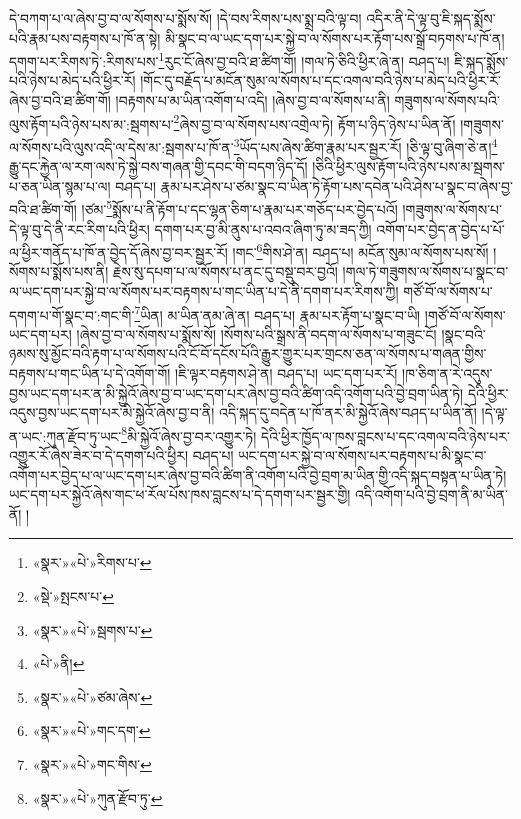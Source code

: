 དེ་བཀག་པ་ལ་ཞེས་བྱ་བ་ལ་སོགས་པ་སྨོས་སོ། །དེ་བས་རིགས་པས་སྨྲ་བའི་ལྟ་བ། འདིར་ནི་དེ་ལྟ་བུ་ཇི་སྐད་སྨོས་པའི་རྣམ་པས་བརྟགས་པ་ཁོ་ན་སྟེ། མི་སྣང་བ་ལ་ཡང་དག་པར་སྐྱེ་བ་ལ་སོགས་པར་རྟོག་པས་སྒྲོ་བཏགས་པ་ཁོ་ན། དགག་པར་རིགས་ཏེ་:རིགས་པས་\footnote{«སྣར་»«པེ་»རིགས་པ་}རུང་ངོ་ཞེས་བྱ་བའི་ཐ་ཚིག་གོ། །གལ་ཏེ་ཅིའི་ཕྱིར་ཞེ་ན། བཤད་པ། ཇི་སྐད་སྨོས་པའི་ཉེས་པ་མེད་པའི་ཕྱིར་རོ། །གོང་དུ་བརྗོད་པ་མངོན་སུམ་ལ་སོགས་པ་དང་འགལ་བའི་ཉེས་པ་མེད་པའི་ཕྱིར་རོ་ཞེས་བྱ་བའི་ཐ་ཚིག་གོ། །བརྟགས་པ་མ་ཡིན་འགོག་པ་འདི། །ཞེས་བྱ་བ་ལ་སོགས་པ་ནི། གཟུགས་ལ་སོགས་པའི་ལུས་རྟོག་པའི་ཉེས་པས་མ་:སྦགས་པ་\footnote{«སྡེ་»སྤངས་པ་}ཞེས་བྱ་བ་ལ་སོགས་པས་འགྲེལ་ཏེ། རྟོག་པ་ཉིད་ཉེས་པ་ཡིན་ནོ། །གཟུགས་ལ་སོགས་པའི་ལུས་འདི་ལ་དེས་མ་:སྦགས་པ་ཁོ་ན་\footnote{«སྣར་»«པེ་»སྦགས་པ་}ཡོད་པས་ཞེས་ཚིག་རྣམ་པར་སྦྱར་རོ། །ཅི་ལྟ་བུ་ཞིག་ཅེ་ན།\footnote{«པེ་»ནི།} རྒྱུ་དང་རྐྱེན་ལ་རག་ལས་ཏེ་སྐྱེ་བས་གཞན་གྱི་དབང་གི་བདག་ཉིད་དོ། །ཅིའི་ཕྱིར་ལུས་རྟོག་པའི་ཉེས་པས་མ་སྦགས་པ་ཅན་ཡིན་སྙམ་པ་ལ། བཤད་པ། རྣམ་པར་ཤེས་པ་ཙམ་སྣང་བ་ཡིན་ཏེ་རྟོག་པས་དབེན་པའི་ཤེས་པ་སྣང་བ་ཞེས་བྱ་བའི་ཐ་ཚིག་གོ། །ཙམ་\footnote{«སྣར་»«པེ་»ཙམ་ཞེས་}སྨོས་པ་ནི་རྟོག་པ་དང་ལྷན་ཅིག་པ་རྣམ་པར་གཅོད་པར་བྱེད་པའོ། །གཟུགས་ལ་སོགས་པ་དེ་ལྟ་བུ་དེ་ནི་རང་རིག་པའི་ཕྱིར། དགག་པར་བྱ་མི་ནུས་པ་འབའ་ཞིག་ཏུ་མ་ཟད་ཀྱི། འགོག་པར་བྱེད་ན་བྱེད་པ་པོ་ལ་ཕྱིར་གནོད་པ་ཁོ་ན་བྱེད་དོ་ཞེས་བྱ་བར་སྦྱར་རོ། །གང་\footnote{«སྣར་»«པེ་»གང་དག་}གིས་ཤེ་ན། བཤད་པ། མངོན་སུམ་ལ་སོགས་པས་སོ། །སོགས་པ་སྨོས་པས་ནི། རྗེས་སུ་དཔག་པ་ལ་སོགས་པ་ནང་དུ་བསྡུ་བར་བྱའོ། །གལ་ཏེ་གཟུགས་ལ་སོགས་པ་སྣང་བ་ལ་ཡང་དག་པར་སྐྱེ་བ་ལ་སོགས་པར་བརྟགས་པ་གང་ཡིན་པ་དེ་ནི་དགག་པར་རིགས་ཀྱི། གཙོ་བོ་ལ་སོགས་པ་དགག་པ་གོ་སྣང་བ་:གང་གི་\footnote{«སྣར་»«པེ་»གང་གིས་}ཡིན། མ་ཡིན་ནམ་ཞེ་ན། བཤད་པ། རྣམ་པར་རྟོག་པ་སྣང་བ་ཡི། །གཙོ་བོ་ལ་སོགས་ཡང་དག་པར། །ཞེས་བྱ་བ་ལ་སོགས་པ་སྨོས་སོ། །སོགས་པའི་སྒྲས་ནི་བདག་ལ་སོགས་པ་གཟུང་ངོ། །སྣང་བའི་ཉམས་སུ་མྱོང་བའི་རྟག་པ་ལ་སོགས་པའི་ངོ་བོ་དངོས་པོའི་རྒྱུར་གྱུར་པར་གྲངས་ཅན་ལ་སོགས་པ་གཞན་གྱིས་བརྟགས་པ་གང་ཡིན་པ་དེ་འགོག་གོ། །ཇི་ལྟར་བརྟགས་ཤེ་ན། བཤད་པ། ཡང་དག་པར་རོ། །ཁ་ཅིག་ན་རེ་འདུས་བྱས་ཡང་དག་པར་ན་མི་སྐྱེའོ་ཞེས་བྱ་བ་ཡང་དག་པར་ཞེས་བྱ་བའི་ཚིག་འདི་འགོག་པའི་བྱེ་བྲག་ཡིན་ཏེ། དེའི་ཕྱིར་འདུས་བྱས་ཡང་དག་པར་མི་སྐྱེའོ་ཞེས་བྱ་བ་ནི། འདི་སྐད་དུ་བདེན་པ་ཁོ་ནར་མི་སྐྱེའོ་ཞེས་བཤད་པ་ཡིན་ནོ། །དེ་ལྟ་ན་ཡང་:ཀུན་རྫོབ་ཏུ་ཡང་\footnote{«སྣར་»«པེ་»ཀུན་རྫོབ་ཏུ་}མི་སྐྱེའོ་ཞེས་བྱ་བར་འགྱུར་ཏེ། དེའི་ཕྱིར་ཁྱོད་ལ་ཁས་བླངས་པ་དང་འགལ་བའི་ཉེས་པར་འགྱུར་རོ་ཞེས་ཟེར་བ་དེ་དགག་པའི་ཕྱིར། བཤད་པ། ཡང་དག་པར་སྐྱེ་བ་ལ་སོགས་པར་བརྟགས་པ་མི་སྣང་བ་འགོག་པར་བྱེད་པ་ལ་ཡང་དག་པར་ཞེས་བྱ་བའི་ཚིག་ནི་འགོག་པའི་བྱེ་བྲག་མ་ཡིན་གྱི་འདི་སྐད་བསྟན་པ་ཡིན་ཏེ། ཡང་དག་པར་སྐྱེའོ་ཞེས་གང་ཕ་རོལ་པོས་ཁས་བླངས་པ་དེ་དགག་པར་སྦྱར་གྱི། འདི་འགོག་པའི་བྱེ་བྲག་ནི་མ་ཡིན་ནོ། །
